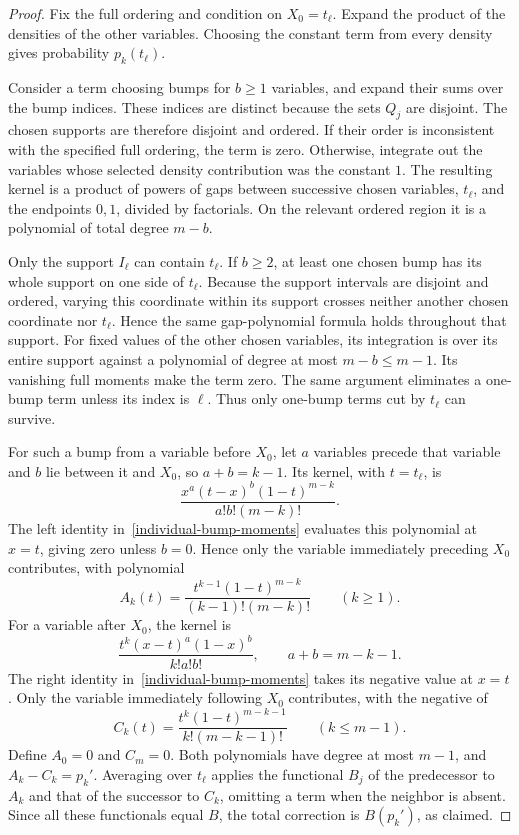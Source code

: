 \begin{proof}
Fix the full ordering and condition on \(X_0=t_\ell\).  Expand the
product of the densities of the other variables.  Choosing the constant
term from every density gives probability \(p_k(t_\ell)\).

Consider a term choosing bumps for \(b\geq1\) variables, and expand
their sums over the bump indices.  These indices are distinct because
the sets \(Q_j\) are disjoint.  The chosen supports are therefore
disjoint and ordered.  If their order is inconsistent with the specified
full ordering, the term is zero.  Otherwise, integrate out the variables
whose selected density contribution was the constant \(1\).  The
resulting kernel is a product of powers of gaps between successive
chosen variables, \(t_\ell\), and the endpoints \(0,1\), divided by
factorials.  On the relevant ordered region it is a polynomial of total
degree \(m-b\).

Only the support \(I_\ell\) can contain \(t_\ell\).  If \(b\geq2\),
at least one chosen bump has its whole support on one side of
\(t_\ell\).  Because the support intervals are disjoint and ordered,
varying this coordinate within its support crosses neither another
chosen coordinate nor \(t_\ell\).  Hence the same gap-polynomial formula
holds throughout that support.  For fixed values of the other chosen variables, its
integration is over its entire support against a polynomial of degree
at most \(m-b\leq m-1\).  Its vanishing full moments make the term
zero.  The same argument eliminates a one-bump term unless its index
is \(\ell\).  Thus only one-bump terms cut by \(t_\ell\) can survive.

For such a bump from a variable before \(X_0\), let \(a\) variables
precede that variable and \(b\) lie between it and \(X_0\), so
\(a+b=k-1\).  Its kernel, with \(t=t_\ell\), is
\[
  \frac{x^a(t-x)^b(1-t)^{m-k}}{a!b!(m-k)!}.
\]
The left identity in~\eqref{individual-bump-moments} evaluates this
polynomial at \(x=t\), giving zero unless \(b=0\).  Hence only the
variable immediately preceding \(X_0\) contributes, with polynomial
\[
  A_k(t)=\frac{t^{k-1}(1-t)^{m-k}}{(k-1)!(m-k)!}
  \qquad(k\geq1).
\]
For a variable after \(X_0\), the kernel is
\[
  \frac{t^k(x-t)^a(1-x)^b}{k!a!b!},\qquad a+b=m-k-1.
\]
The right identity in~\eqref{individual-bump-moments} takes its
negative value at \(x=t\).  Only the variable immediately following
\(X_0\) contributes, with the negative of
\[
  C_k(t)=\frac{t^k(1-t)^{m-k-1}}{k!(m-k-1)!}
  \qquad(k\leq m-1).
\]
Define \(A_0=0\) and \(C_m=0\).  Both polynomials have degree at most
\(m-1\), and \(A_k-C_k=p_k'\).  Averaging over \(t_\ell\) applies
the functional \(B_j\) of the predecessor to \(A_k\) and that of the
successor to \(C_k\), omitting a term when the neighbor is absent.
Since all these functionals equal \(B\), the total correction is
\(B(p_k')\), as claimed.
\end{proof}


